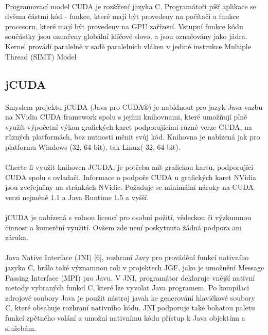 \documentclass[bc,male,java,dept460]{diploma}		%
\begin{document}
\paragraph*{}
Programovací model CUDA je rozšíření jazyka C. Programátoři píší aplikace se dvěma částmi kód - funkce, které mají být provedeny na počítači a funkce procesoru, které mají být provedeny na GPU zařízení. Vstupní funkce kódu součástky jsou označeny globální klíčové slovo, a jsou označovány jako jádra. Kernel provádí paralelně v sadě paralelních vláken v jediné instrukce Multiple Thread (SIMT) Model

\subsection{jCUDA}
\paragraph*{}
Smyslem projektu jCUDA (Java pro CUDA®) je nabídnout pro jazyk Java vazbu na NVidia CUDA framework spolu s jejími knihovnami, které umožňují plně využít výpočetní výkon grafických karet podporujícími různé verze CUDA, na různých platformách, bez nutnosti měnit svůj kód. Knihovna je nabízená jak pro platformu Windows (32, 64-bit), tak Linux( 32, 64-bit). 

\paragraph*{}
Chcete-li využit knihoven JCUDA, je potřeba mít grafickou kartu, podporující CUDA spolu s ovladači. Informace o podpoře CUDA u grafických karet NVidia jsou zveřejněny na stránkách NVidie. Požaduje se minimální nároky na CUDA verzi nejméně 1.1 a Java Runtime 1.5 a vyšší.

\paragraph*{}
jCUDA je nabízená s volnou licencí pro osobní požití, vědeckou či výzkumnou činnost a komerční využití. Ovšem zde není poskytnuta žádná podpora ani záruka.

\paragraph*{}
Java Native Interface (JNI) [6], rozhraní Javy pro provádění funkcí nativního jazyka C, hrálo také významnou roli v projektech JGF, jako je umožnění Message Passing Interface (MPI) pro Javu. V JNI, programátor deklaruje vnější nativní metody vybraných funkcí C, které lze vyvolat Java programem. Po kompilaci zdrojové soubory Java je použit nástroj javah ke generování hlavičkové soubory C, které obsahuje rozhraní nativního kódu. JNI podporuje také bohatou paletu funkcí zpětného volání a umožní nativnímu kódu přístup k Java objektům a služebám.
\end{document}
